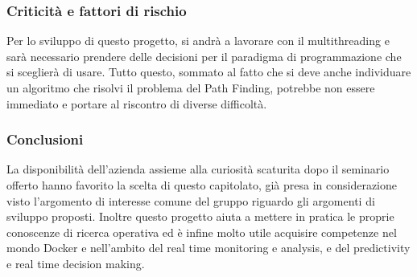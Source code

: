 \subsubsection{Criticità e fattori di rischio}
Per lo sviluppo di questo progetto, si andrà a lavorare con il multithreading e sarà necessario prendere delle decisioni per il paradigma di programmazione che si sceglierà di usare. 
Tutto questo, sommato al fatto che si deve anche individuare un algoritmo che risolvi il problema del Path Finding, potrebbe non essere immediato e portare al riscontro di diverse difficoltà.
\subsubsection{Conclusioni}
La disponibilità dell'azienda assieme alla curiosità scaturita dopo il seminario offerto hanno favorito la scelta di questo capitolato, già presa in considerazione visto l'argomento di interesse comune del gruppo riguardo gli argomenti di sviluppo proposti.
Inoltre questo progetto aiuta a mettere in pratica le proprie conoscenze di ricerca operativa ed è infine molto utile acquisire competenze nel mondo Docker e nell'ambito del real time monitoring e analysis, e del predictivity e real time decision making.